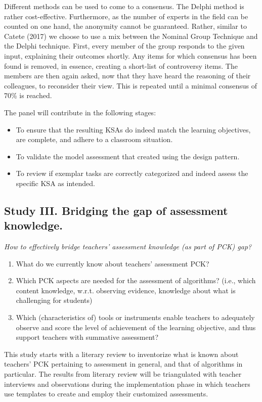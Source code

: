 Different methods can be used to come to a consensus. The Delphi method is rather cost-effective. Furthermore, as the number of experts in the field can be counted on one hand, the anonymity cannot be guaranteed. Rather, similar to Catete (2017) we choose to use a mix between the Nominal Group Technique and the Delphi technique. First, every member of the group responds to the given input, explaining their outcomes shortly. Any items for which consensus has been found is removed, in essence, creating a short-list of controversy items. The members are then again asked, now that they have heard the reasoning of their colleagues, to reconsider their view. This is repeated until a minimal consensus of 70\% is reached.

The panel will contribute in the following stages:
\begin{itemize}
\item To ensure that the resulting KSAs do indeed match the learning objectives, are complete, and adhere to a classroom situation.
\item To validate the model assessment that created using the design pattern.
\item To review if exemplar tasks are correctly categorized and indeed assess the specific KSA as intended.
\end{itemize}




\subsection{Study III. Bridging the gap of assessment knowledge.}
\textit{How to effectively bridge teachers' assessment knowledge (as part of PCK) gap?}

\begin{enumerate}
\item What do we currently know about teachers' assessment PCK?
\item Which PCK aspects are needed for the assessment of algorithms? (i.e., which content knowledge, w.r.t. observing evidence, knowledge about what is challenging for students)
\item Which (characteristics of) tools or instruments enable teachers to adequately observe and score the level of achievement of the learning objective, and thus support teachers with summative assessment?
\end{enumerate}

This study starts with a literary review to inventorize what is known about teachers' PCK pertaining to assessment in general, and that of algorithms in particular. The results from literary review will be triangulated with teacher interviews and observations during the implementation phase in which teachers use templates to create and employ their customized assessments.

